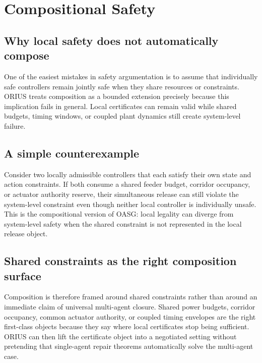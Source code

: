 \chapter{Compositional Safety}
\label{ch:compositional-safety}

\section{Why local safety does not automatically compose}
One of the easiest mistakes in safety argumentation is to assume that individually safe
controllers remain jointly safe when they share resources or constraints. ORIUS treats
composition as a bounded extension precisely because this implication fails in general.
Local certificates can remain valid while shared budgets, timing windows, or coupled plant
dynamics still create system-level failure.

\section{A simple counterexample}
Consider two locally admissible controllers that each satisfy their own state and action
constraints. If both consume a shared feeder budget, corridor occupancy, or actuator
authority reserve, their simultaneous release can still violate the system-level constraint
even though neither local controller is individually unsafe. This is the compositional
version of OASG: local legality can diverge from system-level safety when the shared
constraint is not represented in the local release object.

\section{Shared constraints as the right composition surface}
Composition is therefore framed around shared constraints rather than around an immediate
claim of universal multi-agent closure. Shared power budgets, corridor occupancy, common
actuator authority, or coupled timing envelopes are the right first-class objects because
they say where local certificates stop being sufficient. ORIUS can then lift the
certificate object into a negotiated setting without pretending that single-agent repair
theorems automatically solve the multi-agent case.


